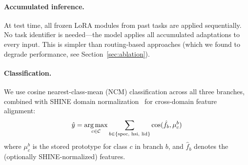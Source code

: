\paragraph{Accumulated inference.}
At test time, all frozen LoRA modules from past tasks are applied sequentially. No task identifier is needed---the model applies all accumulated adaptations to every input. This is simpler than routing-based approaches (which we found to degrade performance, see Section~\ref{sec:ablation}).

\paragraph{Classification.}
We use cosine nearest-class-mean (NCM) classification across all three branches, combined with SHINE domain normalization~\cite{shine2024} for cross-domain feature alignment:
\begin{equation}
    \hat{y} = \operatorname*{arg\,max}_{c \in \mathcal{C}} \sum_{b \in \{\text{spec, hsi, lid}\}} \operatorname{cos}(\hat{f}_b, \mu_c^b)
\end{equation}
where $\mu_c^b$ is the stored prototype for class $c$ in branch $b$, and $\hat{f}_b$ denotes the (optionally SHINE-normalized) features.
